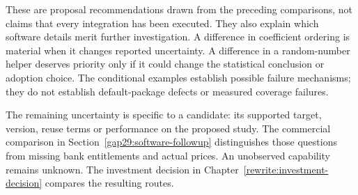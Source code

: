These are proposal recommendations drawn from the preceding comparisons, not
claims that every integration has been executed. They also explain which
software details merit further investigation. A difference in coefficient
ordering is material when it changes reported uncertainty. A difference in a
random-number helper deserves priority only if it could change the statistical
conclusion or adoption choice. The conditional examples establish possible
failure mechanisms; they do not establish default-package defects or measured
coverage failures.~\citep{exec29_panel_inference_sources,exec29_panel_runtime_reference}

The remaining uncertainty is specific to a candidate: its supported target,
version, reuse terms or performance on the proposed study. The commercial
comparison in Section~\ref{gap29:software-followup} distinguishes those
questions from missing bank entitlements and actual prices. An unobserved
capability remains unknown. The investment decision in
Chapter~\ref{rewrite:investment-decision} compares the resulting routes.
